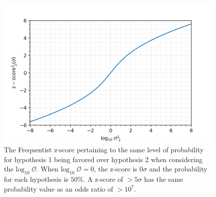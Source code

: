 \begin{figure}
  \includegraphics[width=\linewidth]{figs/chapter2/log10odds_z_score.png}
  \caption{The Frequentist z-score pertaining to the same level of probability for  hypothesis 1 being favored over hypothesis 2 when considering the $\mathrm{log}_{10} \; \mathcal{O}$. When $\mathrm{log}_{10} \; \mathcal{O} = 0$, the z-score is $0 \sigma$ and the probability for each hypothesis is $50\%$. A z-score of $>5 \sigma$ has the same probability value as an odds ratio of $> 10^7$.}
  \label{fig:log10odds_v_z_score}
\end{figure}
